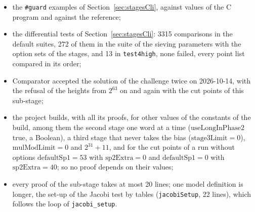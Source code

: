 \begin{itemize}
    the set-up of the sieving thread to the declarations that model them, the includes of the
    private header in \verb|sift.c| and \verb|init.c| to the exclusions, the representation of the
    negative words in the deviation of the loop, the natural numbers for the \verb|long|s as a
    standing deviation, the ends of the rows to stage~F4, the bound of the counts under \verb|-U 0|
    only without \verb|-R|, the exact check as the component that delivers the mapped points in the
    docstring of \verb|swapPoint|, the entries of the forbidden divisors among the places where the
    C code sets the reciprocal (stage~I), and \verb|find_points.c| beside \verb|sift.c| in the
    reason of the exclusion of the inlining attributes), and of the code, the blueprint and the
    descriptions against the conventions of the project (43 findings, 38 confirmed), 56 findings and
    49 confirmed in all, applied in thirteen rounds, among them the degree in place of the factor of
    the exact check, as \verb|_ratpoints_check_point| reads it, the tables of the Jacobi test built
    in the loop of the set-up, as \verb|jacobi_setup| builds them, the test of a candidate read as a
    value next to its contract, the invariant of the binary algorithm folded, the lemmas on the
    words of the rows next to their definitions, and the imports trimmed;
  \item the \verb|#guard| examples of Section~\ref{sec:stagesCli}, against values of the C program
    and against the reference;
  \item the differential tests of Section~\ref{sec:stagesCli}: 3315 comparisons in the default
    suites, 272 of them in the suite of the sieving parameters with the option sets of the stages,
    and 13 in \verb|test4high|, none failed, every point list compared in its order;
  \item Comparator accepted the solution of the challenge twice on 2026-10-14, with the refusal of
    the heights from $2^{63}$ on and again with the cut points of this sub-stage;
  \item the project builds, with all its proofs, for other values of the constants of the build,
    among them the second stage one word at a time ($\mathrm{useLongInPhase2}$ true, a Boolean), a
    third stage that never takes the bias ($\mathrm{stage3Limit} = 0$), $\mathrm{mulModLimit} = 0$
    and $2^{31} + 11$, and for the cut points of a run without options $\mathrm{defaultSp1} = 53$
    with $\mathrm{sp2Extra} = 0$ and $\mathrm{defaultSp1} = 0$ with $\mathrm{sp2Extra} = 40$; so no
    proof depends on their values;
  \item every proof of the sub-stage takes at most 20 lines; one model definition is longer, the
    set-up of the Jacobi test by tables (\verb|jacobiSetup|, 22 lines), which follows the loop of
    \verb|jacobi_setup|.
\end{itemize}
